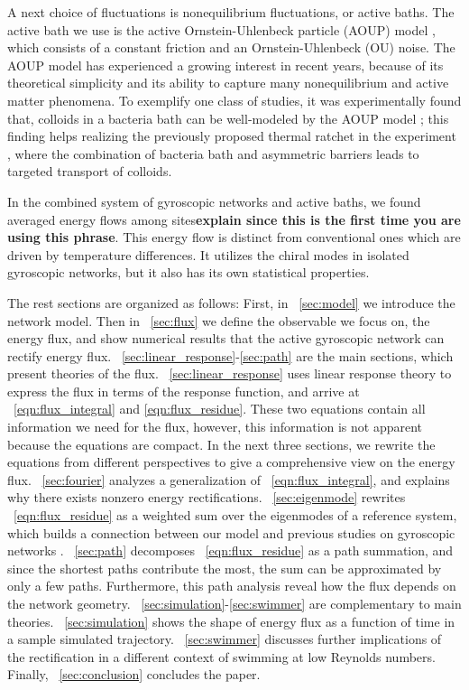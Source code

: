 \documentclass[
 preprint,
 preprintnumbers,
 amsmath,amssymb,
 aps,
 pre,
 longbibliography,
 10pt, twocolumn
]{revtex4-1}
\begin{document}
A next choice of fluctuations is nonequilibrium fluctuations, or active baths.
The active bath we use is the active Ornstein-Uhlenbeck particle (AOUP) model \cite{Fodor2016HowMatter}, which consists of a constant friction and an Ornstein-Uhlenbeck (OU) noise. The AOUP model has experienced a growing interest in recent years, because of its theoretical simplicity and its ability to capture many nonequilibrium and active matter phenomena.
To exemplify one class of studies, it was experimentally found that, colloids in a bacteria bath can be well-modeled by the AOUP model \cite{Wu2000ParticleBath}; this finding helps realizing the previously proposed thermal ratchet \cite{Magnasco1993ForcedRatchets} in the experiment \cite{Koumakis2013TargetedBacteria}, where the combination of bacteria bath and asymmetric barriers leads to targeted transport of colloids.

In the combined system of gyroscopic networks and active baths, we found averaged energy flows among sites{\bf explain since this is the first time you are using this phrase}. This energy flow is distinct from conventional ones which are driven by temperature differences. It utilizes the chiral modes in isolated gyroscopic networks, but it also has its own statistical properties.

The rest sections are organized as follows:
First, in \secname~\ref{sec:model} we introduce the network model. 
Then in \secname~\ref{sec:flux} we define the observable we focus on, the energy flux, and show numerical results that the active gyroscopic network can rectify energy flux.
\secname~\ref{sec:linear_response}-\ref{sec:path} are the main sections, which present theories of the flux. 
\secname~\ref{sec:linear_response} uses linear response theory to express the flux in terms of the response function, and arrive at \eqnname~\eqref{eqn:flux_integral} and \eqref{eqn:flux_residue}. These two equations contain all information we need for the flux, however, this information is not apparent because the equations are compact. In the next three sections, we rewrite the equations from different perspectives to give a comprehensive view on the energy flux.
\secname~\ref{sec:fourier} analyzes a generalization of \eqnname~\eqref{eqn:flux_integral}, and explains why there exists nonzero energy rectifications.
\secname~\ref{sec:eigenmode} rewrites \eqnname~\eqref{eqn:flux_residue} as a weighted sum over the eigenmodes of a reference system, which builds a connection between our model and previous studies on gyroscopic networks \cite{Nash2015TopologicalMetamaterials,Mitchell2018AmorphousSets}.
\secname~\ref{sec:path} decomposes \eqnname~\eqref{eqn:flux_residue} as a path summation, and since the shortest paths contribute the most, the sum can be approximated by only a few paths. Furthermore, this path analysis reveal how the flux depends on the network geometry.
\secname~\ref{sec:simulation}-\ref{sec:swimmer} are complementary to main theories. 
\secname~\ref{sec:simulation} shows the shape of energy flux as a function of time in a sample simulated trajectory.
\secname~\ref{sec:swimmer} discusses further implications of the rectification in a different context of swimming at low Reynolds numbers.
Finally, \secname~\ref{sec:conclusion} concludes the paper.
\end{document}
